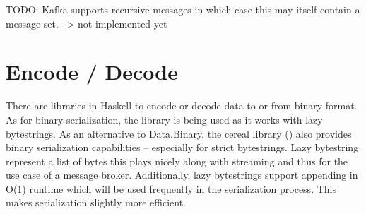 TODO: Kafka supports recursive messages in which case this may itself contain a message set. --> not implemented yet  









\section{Encode / Decode}

There are libraries in Haskell to encode or decode data to or from binary
format. As for binary serialization, the
library is being used as it works with lazy bytestrings. As an alternative to
Data.Binary, the cereal library
()
also provides binary serialization capabilities -- especially for strict
bytestrings. Lazy bytestring represent a list of bytes this plays nicely along
with streaming and thus for the use case of a message broker. Additionally,
lazy bytestrings support appending in O(1) runtime which will be used
frequently in the serialization process. This makes serialization slightly more
efficient.

